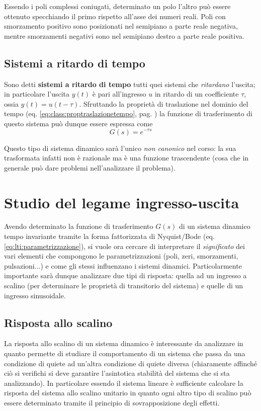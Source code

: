 		Essendo i poli complessi coniugati, determinato un polo l'altro può essere ottenuto specchiando il primo rispetto all'asse dei numeri reali. Poli con smorzamento positivo sono posizionati nel semipiano a parte reale negativa, mentre smorzamenti negativi sono nel semipiano destro a parte reale positiva.
		 
	\subsection{Sistemi a ritardo di tempo} \label{sec:ritardotempo}
		\begin{concetto}
			Sono detti \textbf{sistemi a ritardo di tempo} tutti quei sistemi che \textit{ritardano} l'uscita; in particolare l'uscita $y(t)$ è pari all'ingresso $u$ in ritardo di un coefficiente $\tau$, ossia $y(t) = u(t-\tau)$. Sfruttando la proprietà di traslazione nel dominio del tempo (eq. \ref{eq:class:proptraslazionetempo}, pag. \pageref{eq:class:proptraslazionetempo}) la funzione di trasferimento di questo sistema può dunque essere espressa come
			\begin{equation}
				G(s) = e^{-\tau s}
			\end{equation}
		\end{concetto}
		Questo tipo di sistema dinamico sarà l'unico \textit{non canonico} nel corso: la sua trasformata infatti non è razionale ma è una funzione trascendente (cosa che in generale può dare problemi nell'analizzare il problema).	
	
\section{Studio del legame ingresso-uscita}
	Avendo determinato la funzione di trasferimento $G(s)$ di un sistema dinamico tempo invariante tramite la forma fattorizzata di Nyquist/Bode (eq. \ref{eq:lti:parametrizzazione}), si vuole ora cercare di interpretare il \textit{significato} dei vari elementi che compongono le parametrizzazioni (poli, zeri, smorzamenti, pulsazioni...) e come gli stessi influenzano i sistemi dinamici. Particolarmente importante sarà dunque analizzare due tipi di risposta: quella ad un ingresso a scalino (per determinare le proprietà di transitorio del sistema) e quelle di un ingresso sinusoidale.
	
	\subsection{Risposta allo scalino}
		La risposta allo scalino di un sistema dinamico è interessante da analizzare in quanto permette di studiare il comportamento di un sistema che passa da una condizione di quiete ad un'altra condizione di quiete diversa (chiaramente affinché ciò si verifichi si deve garantire l'asintotica stabilità del sistema che si sta analizzando). In particolare essendo il sistema lineare è sufficiente calcolare la risposta del sistema allo scalino unitario in quanto ogni altro tipo di scalino può essere determinato tramite il principio di sovrapposizione degli effetti.
		
